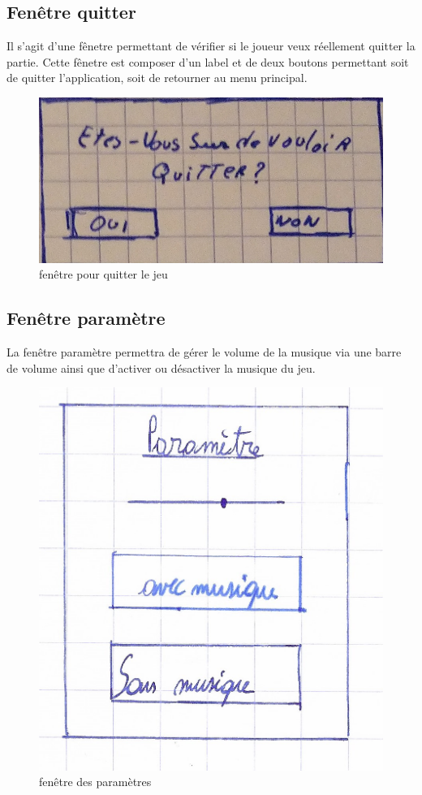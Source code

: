 \subsection{Fenêtre quitter}
Il s'agit d'une fênetre permettant de vérifier si le joueur veux réellement quitter la partie. Cette fênetre est composer d'un label et de deux boutons permettant soit de quitter l'application, soit de retourner au menu principal.
\begin{figure}[ht]
	\centering
	\includegraphics[scale=0.5]{fenetre_quitter.png}
	\caption{fenêtre pour quitter le jeu}
	\label{fenêtre pour quitter le jeu}
\end{figure} 

\subsection{Fenêtre paramètre}
La fenêtre paramètre permettra de gérer le volume de la musique via une barre de volume ainsi que d'activer ou désactiver la musique du jeu.
\begin{figure} [ht]
	\centering
	\includegraphics{setting.jpeg}
	\caption{fenêtre des paramètres}
	\label{fenêtre des paramètres}
\end{figure}